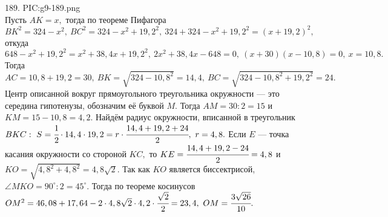 189. {{PIC:g9-189.png}}\\
Пусть $AK=x,$ тогда по теореме Пифагора $BK^2=324-x^2,\ BC^2=324-x^2+19,2^2,\ 324+324-x^2+19,2^2=(x+19,2)^2,$ откуда $648-x^2+19,2^2=x^2+38,4x+19,2^2,\
2x^2+38,4x-648=0,\ (x+30)(x-10,8)=0,\ x=10,8.$ Тогда $AC=10,8+19,2=30,\ BK=\sqrt{324-10,8^2}=14,4,\ BC=\sqrt{324-10,8^2+19,2^2}=24.$ Центр описанной вокруг прямоугольного треугольника окружности --- это середина гипотенузы, обозначим её буквой $M.$ Тогда $AM=30:2=15$ и $KM=15-10,8=4,2.$ Найдём радиус окружности, вписанной в треугольник $BKC:\ S=\cfrac{1}{2}\cdot14,4\cdot19,2=r\cdot\cfrac{14,4+19,2+24}{2},\ r=4,8.$ Если $E$ --- точка касания окружности со стороной $KC,$ то $KE=\cfrac{14,4+19,2-24}{2}=4,8$ и $KO=\sqrt{4,8^2+4,8^2}=4,8\sqrt{2}.$ Так как $KO$ является биссектрисой, $\angle MKO=90^\circ:2=45^\circ.$ Тогда по теореме косинусов $OM^2=46,08+17,64-2\cdot4,8\sqrt{2}\cdot4,2\cdot\cfrac{\sqrt{2}}{2}=23,4,\ OM=\cfrac{3\sqrt{26}}{10}.$\\
